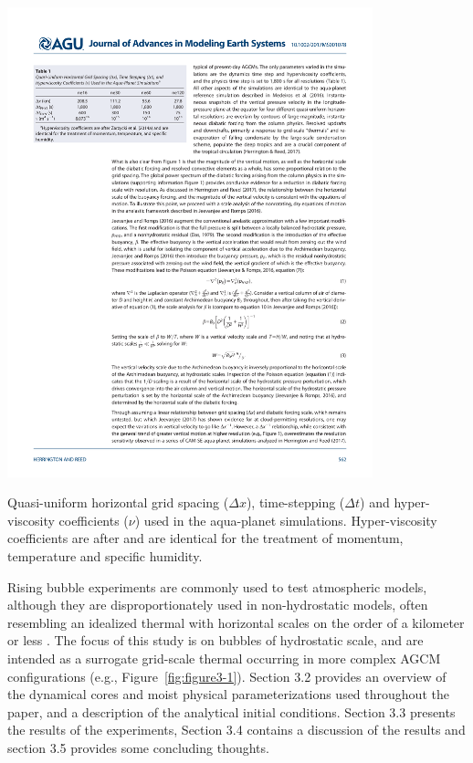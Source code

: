 \begin{table}
\begin{center}
\noindent\includegraphics[width=25pc,angle=0]{chapter3/table1.pdf}\\
\end{center}
\caption{Quasi-uniform horizontal grid spacing ($\Delta x$), time-stepping ($\Delta t$) and hyper-viscosity coefficients ($\nu$) used in the aqua-planet simulations. Hyper-viscosity coefficients are after \cite{ZetAl2014JC} and are identical for the treatment of momentum, temperature and specific humidity.}
\label{tbl:table3-1}
\end{table}

Rising bubble experiments are commonly used to test atmospheric models, although they are disproportionately used in non-hydrostatic models, often resembling an idealized thermal with horizontal scales on the order of a kilometer or less \citep{KW_1978JAS,GETAL1991JAS,BETAL2002MWR,JR2016QJRMS}. The focus of this study is on bubbles of hydrostatic scale, and are intended as a surrogate grid-scale thermal occurring in more complex AGCM configurations (e.g., Figure~\ref{fig:figure3-1}). Section 3.2 provides an overview of the dynamical cores and moist physical parameterizations used throughout the paper, and a description of the analytical initial conditions. Section 3.3 presents the results of the experiments, Section 3.4 contains a discussion of the results and section 3.5 provides some concluding thoughts.

